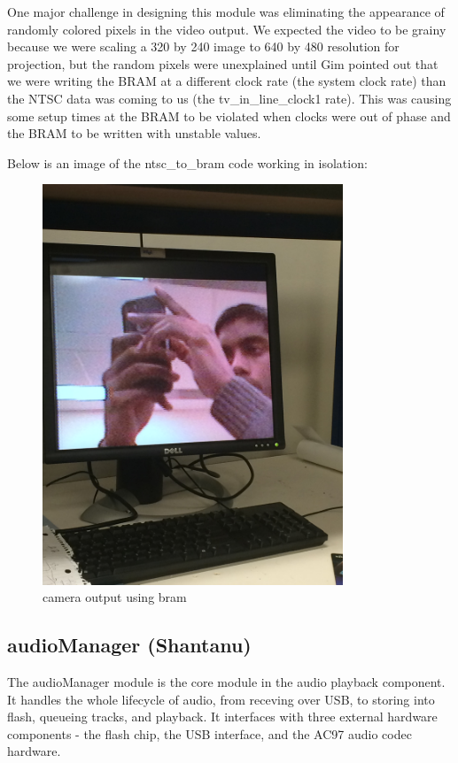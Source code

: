 \documentclass{article}
\begin{document}
One major challenge in designing this module was eliminating the appearance of randomly colored pixels in the video output.
We expected the video to be grainy because we were scaling a 320 by 240 image to 640 by 480 resolution for projection,
but the random pixels were unexplained until Gim pointed out that we were writing the BRAM at a different clock rate (the system clock rate) than the NTSC data was coming to us (the tv\_in\_line\_clock1 rate).
This was causing some setup times at the BRAM to be violated when clocks were out of phase and the BRAM to be written with unstable values.

Below is an image of the ntsc\_to\_bram code working in isolation:
\begin{center}
\begin{figure}[H]
\label{fig:ntsc_to_bram}
\caption{camera output using bram}
\centering
\includegraphics[width=0.8\textwidth, angle=270]{./img/ntsc-complete}
\end{figure}
\end{center}

\subsection{audioManager (Shantanu)}
The audioManager module is the core module in the audio playback component.
It handles the whole lifecycle of audio, from receving over USB, to storing into flash, queueing tracks, and playback.
It interfaces with three external hardware components - the flash chip, the USB interface, and the AC97 audio codec hardware.
\end{document}
